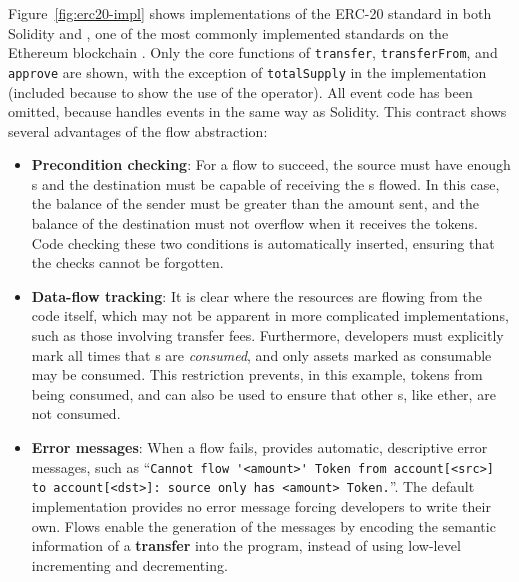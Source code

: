 \documentclass[sigconf]{acmart}
\begin{document}
Figure~\ref{fig:erc20-impl} shows implementations of the ERC-20  standard in both Solidity and \langName, one of the most commonly implemented standards on the Ethereum blockchain .
Only the core functions of \lstinline{transfer}, \lstinline{transferFrom}, and \lstinline{approve} are shown, with the exception of \lstinline{totalSupply} in the \langName implementation (included because to show the use of the \total operator).
All event code has been omitted, because \langName handles events in the same way as Solidity.
This contract shows several advantages of the flow abstraction:
\begin{itemize}
    \item \textbf{Precondition checking}: For a flow to succeed, the source must have enough \assetTxt{}s and the destination must be capable of receiving the \assetTxt{}s flowed.
        In this case, the balance of the sender must be greater than the amount sent, and the balance of the destination must not overflow when it receives the tokens.
        Code checking these two conditions is automatically inserted, ensuring that the checks cannot be forgotten.
    \item \textbf{Data-flow tracking}: It is clear where the resources are flowing from the code itself, which may not be apparent in more complicated implementations, such as those involving transfer fees.
        Furthermore, developers must explicitly mark all times that \assetTxt{}s are \emph{consumed}, and only assets marked as consumable may be consumed.
        This restriction prevents, in this example, tokens from being consumed, and can also be used to ensure that other \assetTxt{}s, like ether, are not consumed.
    \item \textbf{Error messages}: When a flow fails, \langName provides  automatic, descriptive error messages, such as ``\lstinline{Cannot flow '<amount>' Token from account[<src>] to account[<dst>]: source only has <amount> Token.}''.
        The default implementation provides no error message forcing developers to write their own.
        Flows enable the generation of the messages by encoding the semantic information of a \textbf{transfer} into the program, instead of using low-level incrementing and decrementing.
\end{itemize}
\end{document}
